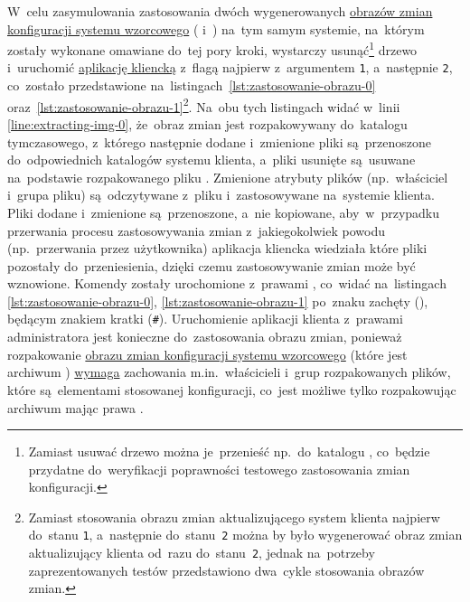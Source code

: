 \documentclass[thesis]{subfiles}
\begin{document}
W~celu zasymulowania zastosowania dwóch wygenerowanych \hyperref[sec:obraz-zmian-konfiguracji]{obrazów zmian konfiguracji systemu wzorcowego} ( i~) na~tym samym systemie, na~którym zostały wykonane omawiane do~tej pory kroki, wystarczy usunąć\footnote{Zamiast usuwać drzewo  można je~przenieść np.~do~katalogu , co~będzie przydatne do~weryfikacji poprawności testowego zastosowania zmian konfiguracji.} drzewo  i~uruchomić \hyperref[sec:cli-app]{aplikację kliencką} z~flagą  najpierw z~argumentem \texttt{1}, a~następnie \texttt{2}, co~zostało przedstawione na~listingach~\ref{lst:zastosowanie-obrazu-0} oraz~\ref{lst:zastosowanie-obrazu-1}\footnote{Zamiast stosowania obrazu zmian aktualizującego system klienta najpierw do~stanu \texttt{1}, a~następnie do~stanu~\texttt{2} można by było wygenerować obraz zmian aktualizujący klienta od~razu do~stanu~\texttt{2}, jednak na~potrzeby zaprezentowanych testów przedstawiono dwa~cykle stosowania obrazów zmian.}. Na~obu tych listingach widać w~linii \ref{line:extracting-img-0}, że~obraz zmian jest rozpakowywany do~katalogu tymczasowego, z~którego następnie dodane i~zmienione pliki są~przenoszone do~odpowiednich katalogów systemu klienta, a~pliki usunięte są~usuwane na~podstawie rozpakowanego pliku . Zmienione atrybuty plików (np.~właściciel i~grupa pliku) są~odczytywane z~pliku  i~zastosowywane na~systemie klienta. Pliki dodane i~zmienione są~przenoszone, a~nie kopiowane, aby~w~przypadku przerwania procesu zastosowywania zmian z~jakiegokolwiek powodu (np.~przerwania przez użytkownika) aplikacja kliencka wiedziała które pliki pozostały do~przeniesienia, dzięki czemu zastosowywanie zmian może być wznowione. Komendy  zostały urochomione z~prawami \superuser{}, co~widać na~listingach \ref{lst:zastosowanie-obrazu-0}, \ref{lst:zastosowanie-obrazu-1} po~znaku zachęty (), będącym znakiem kratki (\texttt{\#}). Uruchomienie aplikacji klienta z~prawami administratora jest konieczne do~zastosowania obrazu zmian, ponieważ rozpakowanie \hyperref[sec:obraz-zmian-konfiguracji]{obrazu zmian konfiguracji systemu wzorcowego} (które jest archiwum \targz{}) \href{https://superuser.com/questions/838392/how-to-tar-a-directory-preserving-not-only-permissions-but-ownership-too}{wymaga} zachowania m.in.~właścicieli i~grup rozpakowanych plików, które są~elementami stosowanej konfiguracji, co~jest możliwe tylko rozpakowując archiwum mając prawa \superuser{}.
\end{document}
